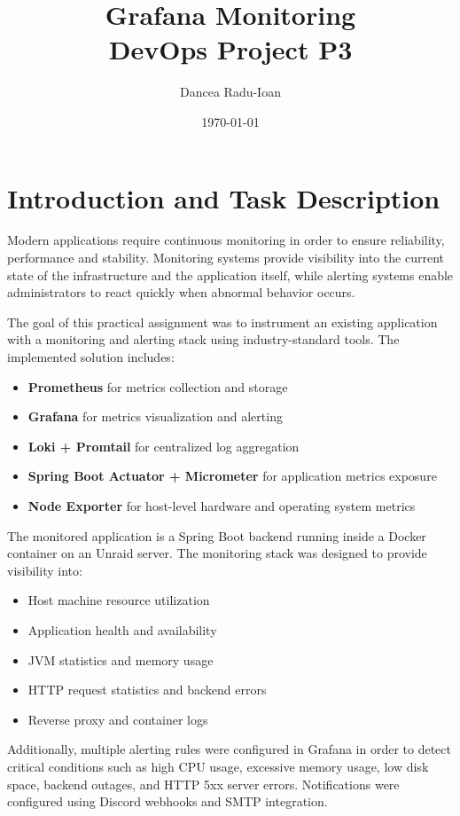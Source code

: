 \documentclass[11pt,a4paper]{article}
\title{\Huge Grafana Monitoring\\DevOps Project P3}
\author{Dancea Radu-Ioan}
\date{\today}
\begin{document}
\maketitle
\tableofcontents
\newpage

\section{Introduction and Task Description}

Modern applications require continuous monitoring in order to ensure reliability, performance and stability. Monitoring 
systems provide visibility into the current state of the infrastructure and the application itself, while alerting systems enable 
administrators to react quickly when abnormal behavior occurs.

The goal of this practical assignment was to instrument an existing application with a monitoring and alerting stack using industry-standard 
tools. The implemented solution includes:

\begin{itemize}
    \item \textbf{Prometheus} for metrics collection and storage
    \item \textbf{Grafana} for metrics visualization and alerting
    \item \textbf{Loki + Promtail} for centralized log aggregation
    \item \textbf{Spring Boot Actuator + Micrometer} for application metrics exposure
    \item \textbf{Node Exporter} for host-level hardware and operating system metrics
\end{itemize}

The monitored application is a Spring Boot backend running inside a Docker container on an Unraid server. The monitoring stack 
was designed to provide visibility into:

\begin{itemize}
    \item Host machine resource utilization
    \item Application health and availability
    \item JVM statistics and memory usage
    \item HTTP request statistics and backend errors
    \item Reverse proxy and container logs
\end{itemize}

Additionally, multiple alerting rules were configured in Grafana in order to detect critical conditions such as high CPU usage, excessive 
memory usage, low disk space, backend outages, and HTTP 5xx server errors. Notifications were configured using Discord webhooks and SMTP integration.
\end{document}
